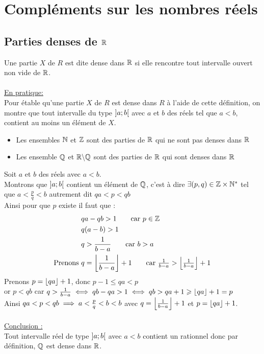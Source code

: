 \chapter{Compléments sur les nombres réels}

\minitoc
\section{Parties denses de \(\mathbb{R}\)}

\begin{defprop}[Généralité]
    Une partie \(X\) de \(R\) est dite dense dans \(\mathbb{R}\) si elle rencontre tout intervalle ouvert non vide de \(\mathbb{R}\). \\
    ~\\
    \underline{En pratique:} \\
    Pour étable qu'une partie \(X\) de \(R\) est dense dans \(R\) à l'aide de cette définition, on montre que tout intervalle du type \(\left]a;b\right[\) avec \(a\) et \(b\) des réels tel que \(a<b\), contient au moins un élément de \(X\).
\end{defprop}

\begin{ex}
\begin{itemize}
    \item Les ensembles \(\mathbb{N}\) et \(\mathbb{Z}\) sont des parties de \(\mathbb{R}\) qui ne sont pas denses dans \(\mathbb{R}\)
    \item Les ensemble \(\mathbb{Q}\) et \(\mathbb{R}\backslash\mathbb{Q}\) sont des parties de \(\mathbb{R}\) qui sont denses dans \(\mathbb{R}\)
\end{itemize}
\end{ex}

\begin{dem}
    Soit \(a\) et \(b\) des réels avec \(a<b\).\\
    Montrons que \(\left]a;b\right[\) contient un élément de \(\mathbb{Q}\), c'est à dire \(\exists (p,q) \in \mathbb{Z}\times\mathbb{N}^*\) tel que \(a<\frac{p}{q}<b\)
    autrement dit \(qa<p<qb\) \\
    Ainsi pour que \(p\) existe il faut que : \\
    \begin{align*}
    &qa - qb > 1       \tag*{car \( p \in \Z \)} \\
    &q(a - b) > 1      \\
    &q > \frac{1}{b-a} \tag*{car \( b > a \)}\\
    \text{Prenons } &q=\floor{\frac{1}{b-a}} +1 \tag*{car \(\frac{1}{b-a}>\floor{\frac{1}{b-a}}+1\)}  
\end{align*}
Prenons \(p=\left\lfloor qa\right\rfloor+1\), donc  \( p-1 \leq qa<p\) \\
or \(p<qb\) car \(q>\frac{1}{b-a} \iff qb-qa>1 \iff qb>qa+1\geqslant \left\lfloor qa\right\rfloor+1=p\) \\
Ainsi \(qa<p<qb\implies a<\frac{p}{q}<b<b\) avec \(q=\left\lfloor\frac{1}{b-a}\right\rfloor +1\) et \(p=\left\lfloor qa\right\rfloor+1\).
\\\\
\underline{Conclusion :} \\
Tout intervalle réel de type \(\left]a;b\right[\) avec \(a<b\) contient un rationnel donc par définition, \(\mathbb{Q}\) est dense dans \(\mathbb{R}\).
\end{dem}

